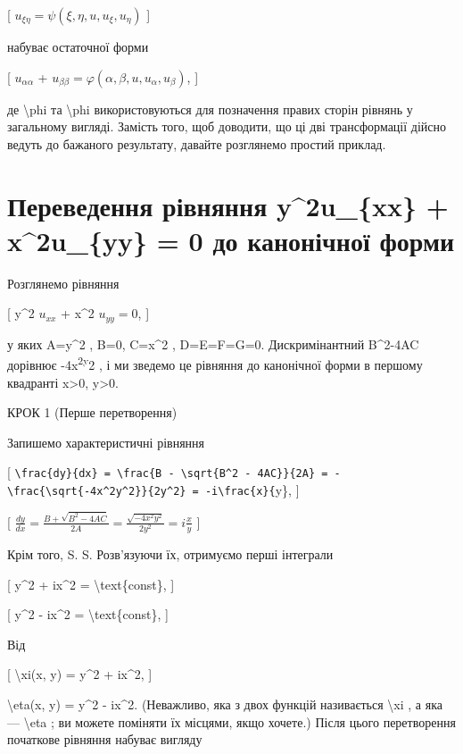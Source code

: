\documentclass[
]{article}
\begin{document}
{{{{[} \(u_{\xi\eta} = \psi(\xi, \eta, u, u_{\xi}, u_{\eta})\) {]}

набуває остаточної форми

{[} \(u_{\alpha\alpha}\) +
\(u_{\beta\beta} = \varphi(\alpha, \beta, u, u_{\alpha}, u_{\beta})\),
{]}

де \textbackslash phi та \textbackslash phi використовуються для
позначення правих сторін рівнянь у загальному вигляді. Замість того, щоб
доводити, що ці дві трансформації дійсно ведуть до бажаного результату,
давайте розглянемо простий приклад.

\section{Переведення рівняння y\^{}2u\_\{xx\} + x\^{}2u\_\{yy\} = 0 до
канонічної
форми}\label{ux43fux435ux440ux435ux432ux435ux434ux435ux43dux43dux44f-ux440ux456ux432ux43dux44fux43dux43dux44f-y2u_xx-x2u_yy-0-ux434ux43e-ux43aux430ux43dux43eux43dux456ux447ux43dux43eux457-ux444ux43eux440ux43cux438}

Розглянемо рівняння

{[} y\^{}2 \(u_{xx}\) + x\^{}2 \(u_{yy} = 0\), {]}

у яких A=y\^{}2 , B=0, C=x\^{}2 , D=E=F=G=0. Дискримінантний B\^{}2-4AC
дорівнює -4x\textsuperscript{2y}2 , і ми зведемо це рівняння до
канонічної форми в першому квадранті x\textgreater0, y\textgreater0.

КРОК 1 (Перше перетворення)

Запишемо характеристичні рівняння

{[}
\texttt{\textbackslash{}frac\{dy\}\{dx\}\ =\ \textbackslash{}frac\{B\ -\ \textbackslash{}sqrt\{B\^{}2\ -\ 4AC\}\}\{2A\}\ =\ -\textbackslash{}frac\{\textbackslash{}sqrt\{-4x\^{}2y\^{}2\}\}\{2y\^{}2\}\ =\ -i\textbackslash{}frac\{x\}\{}y\},
{]}

{[}
\(\frac{dy}{dx} = \frac{B + \sqrt{B^2 - 4AC}}{2A} = \frac{\sqrt{-4x^2y^2}}{2y^2} = i\frac{x}{y}\)
{]}

Крім того, S. S. Розв'язуючи їх, отримуємо перші інтеграли

{[} y\^{}2 + ix\^{}2 = \textbackslash text\{const\}, {]}

{[} y\^{}2 - ix\^{}2 = \textbackslash text\{const\}, {]}

Від

{[} \textbackslash xi(x, y) = y\^{}2 + ix\^{}2, {]}

\textbackslash eta(x, y) = y\^{}2 - ix\^{}2. (Неважливо, яка з двох
функцій називається \textbackslash xi , а яка --- \textbackslash eta ;
ви можете поміняти їх місцями, якщо хочете.) Після цього перетворення
початкове рівняння набуває вигляду

}}}
\end{document}
